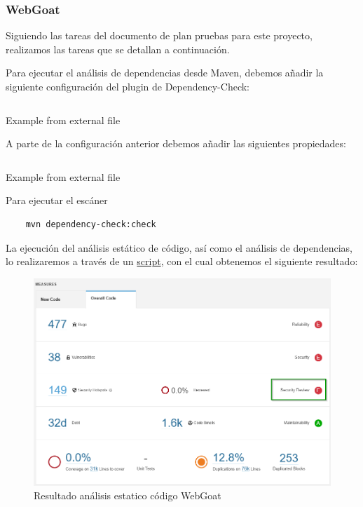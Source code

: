 \subsubsection{WebGoat}
Siguiendo las tareas del documento de plan pruebas para este proyecto, realizamos las tareas que se detallan a continuación.

Para ejecutar el análisis de dependencias desde Maven, debemos añadir la siguiente configuración del plugin de Dependency-Check:

\begin{listing}[h]
    \inputminted{xml}{./Ficheros/ConfiguracionPlugin_Maven.xml}
    \caption{Example from external file}
    \label{listing:4}
\end{listing}

A parte de la configuración anterior debemos añadir las siguientes propiedades:\\

\begin{listing}[h]
    \inputminted{xml}{./Ficheros/ConfigPropertiesPlugin_maven.xml}
    \caption{Example from external file}
    \label{listing:24}
\end{listing}

Para ejecutar el escáner\\

\begin{verbatim}
    mvn dependency-check:check
\end{verbatim}

La ejecución del análisis estático de código, así como el análisis de dependencias, lo realizaremos a través de un 
\href{https://github.com/M0l1n3ta/PFG/blob/master/Scripts/STAT/RunSonarScaner_WebGoat.ps1}{script}, con el cual
obtenemos el siguiente resultado:\\

\begin{figure}[h!]  
    \includegraphics[width=\linewidth]{./imagenes/09_AnalisisEstatico_WebGoat.png}
    \caption{Resultado análisis estatico código WebGoat}  
    \label{fig:25}
\end{figure}

